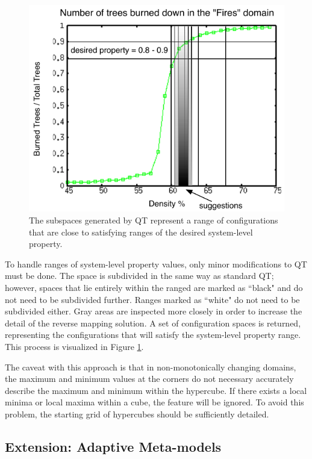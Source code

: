 \begin{figure}[ht]
\centering
\includegraphics[scale=1]{images/QTfiresranges.pdf}
\caption{The subspaces generated by QT represent a range of configurations that are close to satisfying ranges of the desired system-level property.}
\label{fig:qtfiresranges}
\end{figure}
To handle ranges of system-level property values, only minor modifications to QT must be done.
The space is subdivided in the same way as standard QT; however, spaces that lie entirely within the ranged are marked as ``black" and do not need to be subdivided further.
Ranges marked as ``white" do not need to be subdivided either.
Gray areas are inspected more closely in order to increase the detail of the reverse mapping solution.
A set of configuration spaces is returned, representing the configurations that will satisfy the system-level property range.
This process is visualized in Figure \ref{fig:qtfiresranges}.



The caveat with this approach is that in non-monotonically changing domains, the maximum and minimum values at the corners do not necessary accurately describe the maximum and minimum within the hypercube.
If there exists a local minima or local maxima within a cube, the feature will be ignored.
To avoid this problem, the starting grid of hypercubes should be sufficiently detailed.



\subsection{Extension: Adaptive Meta-models}

